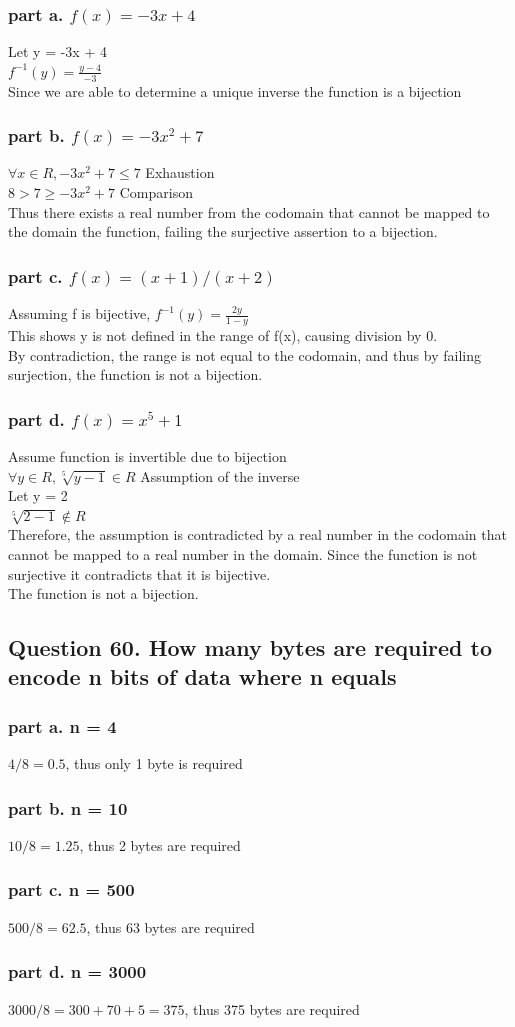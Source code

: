 \documentclass{article}
\begin{document}
\subsubsection{part a. $f (x)= -3x +4$}
Let y = -3x + 4\\
$f^{-1}(y) = \frac{y-4}{-3}$\\
Since we are able to determine a unique inverse the function is a bijection
\subsubsection{part b. $f (x)= -3x^2 +7$}
$\forall x \in R, -3x^2 + 7 \leq 7$ Exhaustion\\
$8 > 7 \geq -3x^2 + 7$ Comparison\\ 
Thus there exists a real number from the codomain that cannot be mapped to the domain the function, failing the surjective assertion to a bijection. 
\subsubsection{part c. $f (x)= (x +1)/(x +2)$}
Assuming f is bijective, $f^{-1}(y) = \frac{2y}{1-y}$\\
This shows y is not defined in the range of f(x), causing division by 0.\\
By contradiction, the range is not equal to the codomain, and thus by failing surjection, the function is not a bijection.
\subsubsection{part d. $f (x)= x^5 +1$}
Assume function is invertible due to bijection\\
$\forall y \in R, \sqrt[5]{y-1} \in R$ Assumption of the inverse\\
Let y = 2\\
$\sqrt[5]{2-1} \notin R$\\ Therefore, the assumption is contradicted by a real number in the codomain that cannot be mapped to a real number in the domain. Since the function is not surjective it contradicts that it is bijective.\\
The function is not a bijection.
\subsection{Question 60. How many bytes are required to encode n bits of data
where n equals}
\subsubsection{part a. n = 4}
$4/8 = 0.5$, thus only 1 byte is required
\subsubsection{part b. n = 10}
$10/8 = 1.25$, thus 2 bytes are required
\subsubsection{part c. n = 500}
$500/8 = 62.5$, thus 63 bytes are required
\subsubsection{part d. n = 3000}
$3000/8 = 300+70+5 = 375$, thus 375 bytes are required
\end{document}
